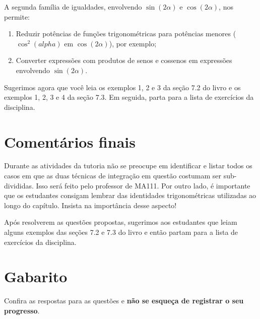 \documentclass[main_estudante.tex]{subfiles}
\begin{document}
A segunda família de igualdades, envolvendo $\sin(2\alpha)$ e $\cos(2\alpha)$, nos permite:
\begin{enumerate}[1)]
\item Reduzir potências de funções trigonométricas para potências menores ($\cos^2(alpha)$ em $\cos(2\alpha)$), por exemplo;
\item Converter expressões com produtos de senos e cossenos em expressões envolvendo $\sin(2\alpha)$.
\end{enumerate}

Sugerimos agora que você leia os exemplos 1, 2 e 3 da seção 7.2 do livro  e os exemplos 1, 2, 3 e 4 da seção 7.3. Em seguida, parta para a lista de exercícios da disciplina.

\paraTutores

\section{Comentários finais}

Durante as atividades da tutoria não se preocupe em identificar e listar todos os casos em que as duas técnicas de integração em questão costumam ser sub-divididas. Isso será feito pelo professor de MA111. Por outro lado, é importante que os estudantes consigam lembrar das identidades trigonométricas utilizadas ao longo do capítulo. Insista na importância desse aspecto!

Após resolverem as questões propostas, sugerimos aos estudantes que leiam alguns exemplos das seções 7.2 e 7.3 do livro  e então partam para a lista de exercícios da disciplina.

\newpage

\paraAmbos

\section{Gabarito}

Confira as respostas para as questões e \textbf{não se esqueça de registrar o seu progresso}.

\imprimeGabarito

\paraAmbos
\end{document}
